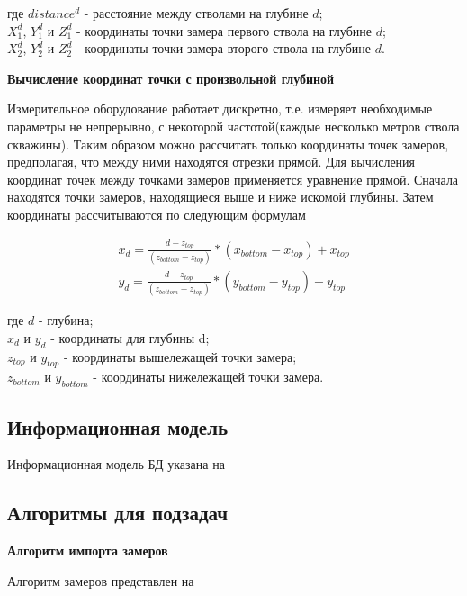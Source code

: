 где $ distance^d $ - расстояние между стволами на глубине $ d $;\\
$ X_1^d $, $ Y_1^d $ и $ Z_1^d $ - координаты точки замера первого ствола на глубине $ d $;\\
$ X_2^d $, $ Y_2^d $ и $ Z_2^d $ - координаты точки замера второго ствола на глубине $ d $.

\textbf{Вычисление координат точки с произвольной глубиной}

Измерительное оборудование работает дискретно, т.е. измеряет необходимые параметры не непрерывно, с некоторой частотой(каждые несколько метров
ствола скважины). Таким образом можно рассчитать только координаты точек замеров, предполагая, что между ними находятся отрезки прямой. Для вычисления
координат точек между точками замеров применяется уравнение прямой. Сначала находятся точки замеров, находящиеся выше и ниже искомой глубины. Затем
координаты рассчитываются по следующим формулам

\begin{equation}
  \begin{split}
    x_d = \frac{d-z_{top}}{(z_{bottom}-z_{top})}*(x_{bottom}-x_{top})+x_{top} \\
    y_d = \frac{d-z_{top}}{(z_{bottom}-z_{top})}*(y_{bottom}-y_{top})+y_{top}
  \end{split}
\end{equation}

где $ d $ - глубина;\\
$ x_d $ и $ y_d $ - координаты для глубины d; \\
$ z_{top} $ и $ y_{top} $ - координаты вышележащей точки замера;\\
$ z_{bottom} $ и $ y_{bottom} $ - координаты нижележащей точки замера.


\subsection{Информационная модель}

Информационная модель БД указана на 


\subsection{Алгоритмы для подзадач}

\textbf{Алгоритм импорта замеров}

Алгоритм  замеров представлен на 

